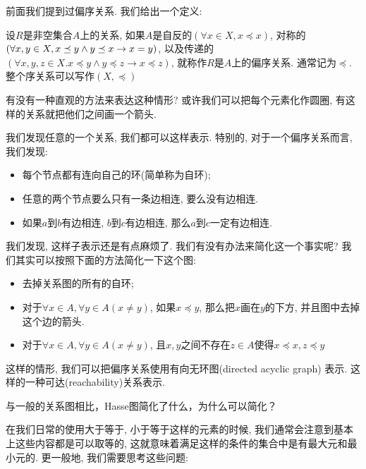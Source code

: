 前面我们提到过偏序关系. 我们给出一个定义: 

\begin{definition}
	设$R$是非空集合$A$上的关系, 如果$A$是自反的$(\forall x\in X, x \preceq x)$, 对称的$(\forall x,y \in X, x \preceq y \land y\preceq x \to x=y)$, 以及传递的$(\forall x,y,z\in X. x \preceq y \land y \preceq z \to x\preceq z)$, 就称作$R$是$A$上的偏序关系. 通常记为$\preceq$. 整个序关系可以写作$(X,\preceq)$
\end{definition}

\begin{bonus}
	有没有一种直观的方法来表达这种情形? 或许我们可以把每个元素化作圆圈, 有这样的关系就把他们之间画一个箭头.  
\end{bonus}

我们发现任意的一个关系, 我们都可以这样表示. 特别的, 对于一个偏序关系而言, 我们发现: 

\begin{itemize}
	\item 每个节点都有连向自己的环(简单称为自环);
	\item 任意的两个节点要么只有一条边相连, 要么没有边相连. 
	\item 如果$a$到$b$有边相连, $b$到$c$有边相连, 那么$a$到$c$一定有边相连. 
\end{itemize}

我们发现, 这样子表示还是有点麻烦了. 我们有没有办法来简化这一个事实呢? 我们其实可以按照下面的方法简化一下这个图: 

\begin{itemize}
	\item 去掉关系图的所有的自环;
	\item 对于$\forall x\in A, \forall y\in A(x\neq y)$, 如果$x\preceq y$, 那么把$x$画在$y$的下方, 并且图中去掉这个边的箭头. 
	\item 对于$\forall x\in A, \forall y \in A(x\neq y)$, 且$x,y$之间不存在$z\in A$使得$x\preceq x,z\preceq y$
\end{itemize}

这样的情形, 我们可以把偏序关系使用有向无环图(directed acyclic graph) 表示. 这样的一种可达(reachability)关系表示.

\begin{bonus}
	与一般的关系图相比，Hasse图简化了什么，为什么可以简化？
\end{bonus} 


在我们日常的使用大于等于, 小于等于这样的元素的时候, 我们通常会注意到基本上这些内容都是可以取等的, 这就意味着满足这样的条件的集合中是有最大元和最小元的. 更一般地, 我们需要思考这些问题: 

